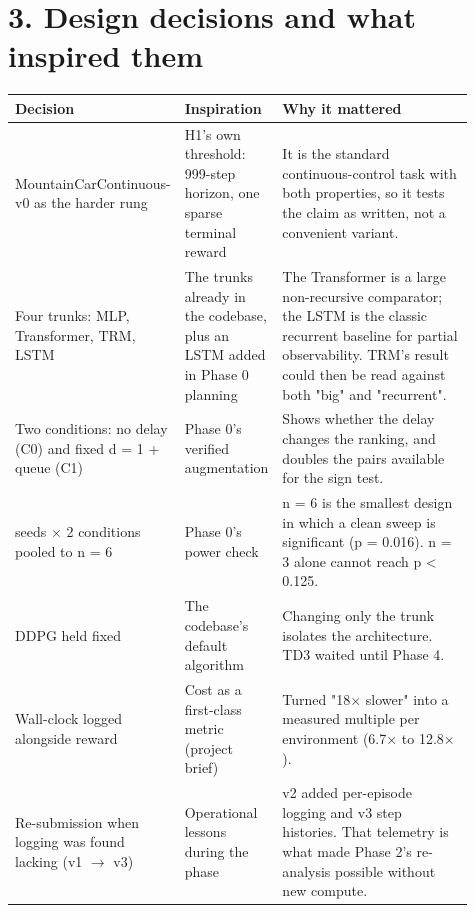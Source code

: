 \documentclass[11pt]{article}
\begin{document}
\section*{3. Design decisions and what inspired them}



\begin{center}\small\begin{tabular}{>{\raggedright\arraybackslash}p{0.276\linewidth}>{\raggedright\arraybackslash}p{0.196\linewidth}>{\raggedright\arraybackslash}p{0.434\linewidth}}
\toprule
Decision & Inspiration & Why it mattered \\
\midrule
MountainCarContinuous-v0 as the harder rung & H1's own threshold: 999-step horizon, one sparse terminal reward & It is the standard continuous-control task with both properties, so it tests the claim as written, not a convenient variant. \\
Four trunks: MLP, Transformer, TRM, LSTM & The trunks already in the codebase, plus an LSTM added in Phase 0 planning & The Transformer is a large non-recursive comparator; the LSTM is the classic recurrent baseline for partial observability. TRM's result could then be read against both "big" and "recurrent". \\
Two conditions: no delay (C0) and fixed d = 1 + queue (C1) & Phase 0's verified augmentation & Shows whether the delay changes the ranking, and doubles the pairs available for the sign test. \\
3 seeds $\times$ 2 conditions pooled to n = 6 & Phase 0's power check & n = 6 is the smallest design in which a clean sweep is significant (p = 0.016). n = 3 alone cannot reach p < 0.125. \\
DDPG held fixed & The codebase's default algorithm & Changing only the trunk isolates the architecture. TD3 waited until Phase 4. \\
Wall-clock logged alongside reward & Cost as a first-class metric (project brief) & Turned "18$\times$ slower" into a measured multiple per environment (6.7$\times$ to 12.8$\times$). \\
Re-submission when logging was found lacking (v1 $\rightarrow$ v3) & Operational lessons during the phase & v2 added per-episode logging and v3 step histories. That telemetry is what made Phase 2's re-analysis possible without new compute. \\
\bottomrule
\end{tabular}\end{center}
\end{document}
